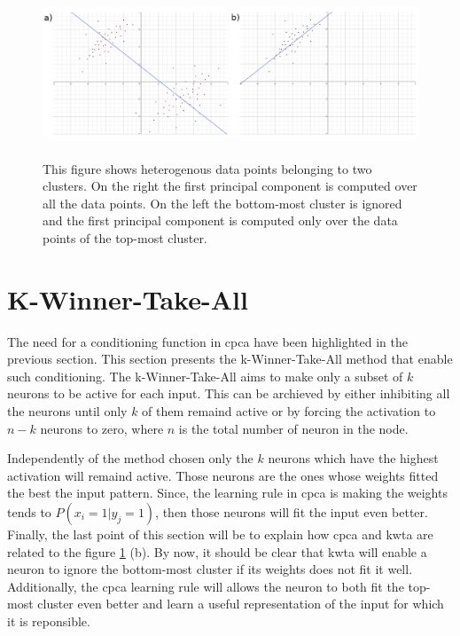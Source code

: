 \documentclass[11pt]{report}
\begin{document}
\begin{figure}[h]
\centering
\includegraphics[width=15cm, height=5cm]{heterogeneous_data}
\caption{This figure shows heterogenous data points belonging to two clusters. On the right the first principal component is computed over all the data points. On the left the bottom-most cluster is ignored and the first principal component is computed only over the data points of the top-most cluster.}
\label{fig:heterogeneous_data}
\end{figure}

\section{K-Winner-Take-All} \label{sec:kwta}

The need for a conditioning function in \acrshort{cpca} have been highlighted in the previous section. This section presents the k-Winner-Take-All method that enable such conditioning. The k-Winner-Take-All aims to make only a subset of $k$ neurons to be active for each input. This can be archieved by either inhibiting all the neurons until only $k$ of them remaind active or by forcing the activation to $n - k$ neurons to zero, where $n$ is the total number of neuron in the node.\newline

Independently of the method chosen only the $k$ neurons which have the highest activation will remaind active. Those neurons are the ones whose weights fitted the best the input pattern. Since, the learning rule in \acrshort{cpca} is making the weights tends to $P(x_i = 1 | y_j = 1)$, then those neurons will fit the input even better. Finally, the last point of this section will be to explain how \acrshort{cpca} and \acrshort{kwta} are related to the figure \ref{fig:heterogeneous_data} (b). By now, it should be clear that \acrshort{kwta} will enable a neuron to ignore the bottom-most cluster if its weights does not fit it well. Additionally, the \acrshort{cpca} learning rule will allows the neuron to both fit the top-most cluster even better and learn a useful representation of the input for which it is reponsible.
\end{document}
